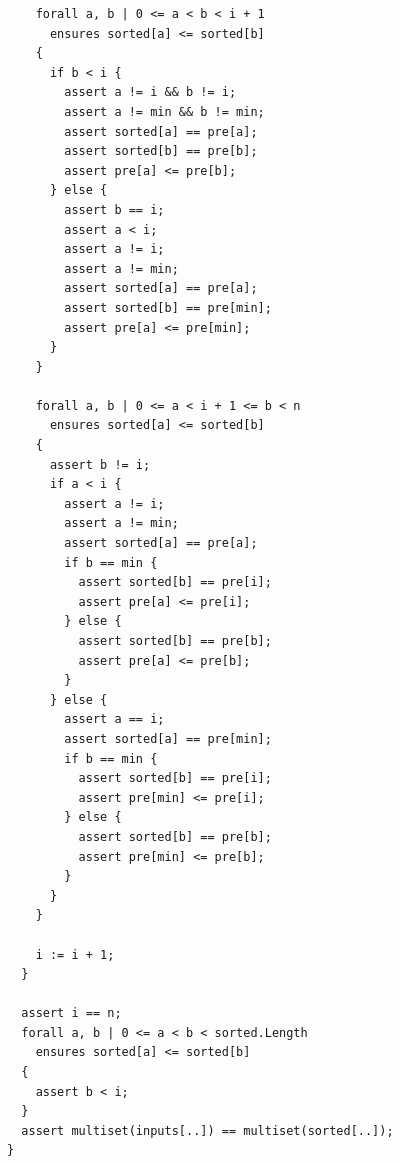 \documentclass{article}
\begin{document}
\begin{lstlisting}
    forall a, b | 0 <= a < b < i + 1
      ensures sorted[a] <= sorted[b]
    {
      if b < i {
        assert a != i && b != i;
        assert a != min && b != min;
        assert sorted[a] == pre[a];
        assert sorted[b] == pre[b];
        assert pre[a] <= pre[b];
      } else {
        assert b == i;
        assert a < i;
        assert a != i;
        assert a != min;
        assert sorted[a] == pre[a];
        assert sorted[b] == pre[min];
        assert pre[a] <= pre[min];
      }
    }

    forall a, b | 0 <= a < i + 1 <= b < n
      ensures sorted[a] <= sorted[b]
    {
      assert b != i;
      if a < i {
        assert a != i;
        assert a != min;
        assert sorted[a] == pre[a];
        if b == min {
          assert sorted[b] == pre[i];
          assert pre[a] <= pre[i];
        } else {
          assert sorted[b] == pre[b];
          assert pre[a] <= pre[b];
        }
      } else {
        assert a == i;
        assert sorted[a] == pre[min];
        if b == min {
          assert sorted[b] == pre[i];
          assert pre[min] <= pre[i];
        } else {
          assert sorted[b] == pre[b];
          assert pre[min] <= pre[b];
        }
      }
    }

    i := i + 1;
  }

  assert i == n;
  forall a, b | 0 <= a < b < sorted.Length
    ensures sorted[a] <= sorted[b]
  {
    assert b < i;
  }
  assert multiset(inputs[..]) == multiset(sorted[..]);
}
\end{lstlisting}
\end{document}
